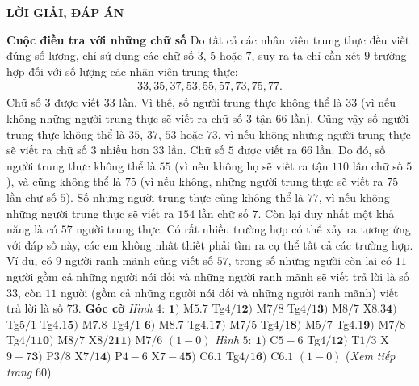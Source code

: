 \begin{center}
	\LARGE\textbf{\color{toancuabi}LỜI GIẢI, ĐÁP ÁN}
\end{center}
\begin{multicols}{2}
	\textbf{\color{toancuabi}Cuộc điều tra với những chữ số}
	\vskip 0.1cm
	Do tất cả các nhân viên trung thực đều viết đúng số lượng, chỉ sử dụng các chữ số $3$, $5$ hoặc $7$, suy ra ta chỉ cần xét $9$ trường hợp đối với số lượng các nhân viên trung thực: 
	\begin{align*}
				33,35,37,53,55,57,73,75,77.
			\end{align*}
	Chữ số $3$ được viết $33$ lần. Vì thế, số người trung thực không thể là $33$ (vì nếu không những người trung thực sẽ viết ra chữ số $3$ tận $66$ lần). Cũng vậy số người trung thực không thể là $35$, $37$, $53$ hoặc $73$, vì nếu không những người trung thực sẽ viết ra chữ số $3$ nhiều hơn $33$ lần.
	\vskip 0.1cm
	Chữ số $5$ được viết ra $66$ lần. Do  đó, số người trung thực không thể là $55$ (vì nếu không họ sẽ viết ra tận $110$ lần chữ số $5$), và cũng không thể là $75$ (vì nếu không, những người trung thực sẽ viết ra $75$ lần chữ số $5$).
	\vskip 0.1cm
	Số những người trung thực cũng không thể là $77$, vì nếu không những người trung thực sẽ viết ra $154$ lần chữ số $7$. 
	\vskip 0.1cm
	Còn lại duy nhất một khả năng là có $57$ người trung thực. Có rất nhiều trường hợp có thể xảy ra tương ứng với đáp số này, các em không nhất thiết phải tìm ra cụ thể tất cả các trường hợp.
	\vskip 0.1cm
	Ví dụ, có $9$ người ranh mãnh cũng viết số $57$, trong số những người còn lại có $11$ người gồm cả những người nói dối và những người ranh mãnh sẽ viết trả lời là số $33$, còn $11$ người (gồm cả những người nói dối và những người ranh mãnh) viết trả lời là số $73$.
	\vskip 0.1cm
	\textbf{\color{toancuabi}Góc cờ}
	\vskip 0.1cm
	\textit{Hình} $4$: $\pmb{1)}$ M$5.7$ Tg$4/1$\quad $\pmb{2)}$ M$7/8$ Tg$4/1$\quad  $\pmb{3)}$ M$8/7$ X$8.3$\quad $\pmb{4)}$ Tg$5/1$  Tg$4.1$\quad  $\pmb{5)}$ M$7.8$ Tg$4/1$ \quad$\pmb{6)}$ M$8.7$ Tg$4.1$\quad $\pmb{7)}$ M$7/5$ Tg$4/1$\quad $\pmb{8)}$ M$5/7$ Tg$4.1$\quad $\pmb{9)}$ M$7/8$ Tg$4/1$\quad $\pmb{10)}$ M$8/7$ X$8/2$\quad $\pmb{11)}$ M$7/6$ $(1-0)$
	\vskip 0.1cm
	\textit{Hình} $5$: 
	$\pmb{1)}$ C$5-6$ Tg$4/1$\quad $\pmb{2)}$ T$1/3$ X$9-7$\quad  $\pmb{3)}$ P$3/8$ X$7/1$\quad $\pmb{4)}$ P$4-6$  X$7-4$\quad  $\pmb{5)}$ C$6.1$ Tg$4/1$\quad $\pmb{6)}$ C$6.1$ $(1-0)$
	\vskip 0.1cm
	\hfill (\textit{Xem tiếp trang} $60$)
\end{multicols}

